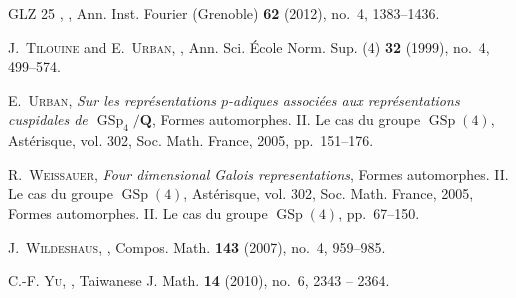 \documentclass[cjm]{ipart}
\theoremstyle{plain}
\theoremstyle{remark}
\newcommand{\QQ}{\mathbf{Q}}
\numberwithin{equation}{subsection}
\begin{document}
\begin{thebibliography}{GLZ 25}
\bysame, , Ann. Inst. Fourier (Grenoble)
  \textbf{62} (2012), no.~4, 1383--1436. 

\textsc{J.~Tilouine} and \textsc{E.~Urban},
  , Ann. Sci. \'Ecole Norm. Sup. (4) \textbf{32}
  (1999), no.~4, 499--574. 

\textsc{E.~Urban}, \emph{Sur les repr\'esentations {$p$}-adiques associ\'ees
  aux repr\'esentations cuspidales de {$\operatorname{GSp}_4 / \QQ$}}, Formes
  automorphes. II. Le cas du groupe {$\operatorname{GSp}(4)$}, Ast{\'e}risque,
  vol. 302, Soc. Math. France, 2005, pp.~151--176. 

\textsc{R.~Weissauer}, \emph{Four dimensional {G}alois representations}, Formes
  automorphes. II. Le cas du groupe {$\operatorname{GSp}(4)$}, Ast{\'e}risque,
  vol. 302, Soc. Math. France, 2005, Formes automorphes. II. Le cas du groupe
  {$\operatorname{GSp}(4)$}, pp.~67--150. 

\textsc{J.~Wildeshaus},
  , Compos. Math. \textbf{143} (2007), no.~4,
  959--985. 

\textsc{C.-F. Yu},
  , Taiwanese J. Math. \textbf{14}
  (2010), no.~6, 2343 -- 2364.

\end{thebibliography}
\end{document}
